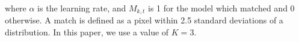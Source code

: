 \documentclass{article}
\begin{document}
where $\alpha$ is the learning rate, and $M_{k,t}$ is 1 for the model which matched and 0 otherwise.  A match is defined as a pixel within 2.5 standard deviations of a distribution.  In this paper, we use a value of $K=3$. 

\end{document}
